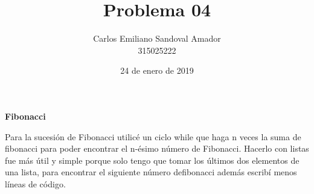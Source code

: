 \documentclass[letterpaper, 12pt, oneside]{article}%
\title{Problema 04}
\author{Carlos Emiliano Sandoval Amador \\ 315025222}
\date{24 de enero de 2019}
\begin{document}
	\maketitle
	\begin{center}
		\textbf{\large Fibonacci}
	\end{center}
	Para la sucesión de Fibonacci utilicé un ciclo while que haga n veces la suma de fibonacci para poder encontrar el n-ésimo número de Fibonacci. Hacerlo con listas fue más útil y simple porque solo tengo que tomar los últimos dos elementos de una lista, para encontrar el siguiente número defibonacci además escribí menos líneas de código.
\end{document}
